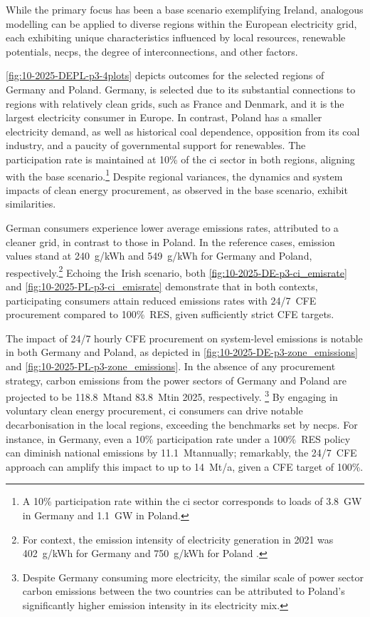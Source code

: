 While the primary focus has been a base scenario exemplifying Ireland, analogous modelling can be applied to diverse regions within the European electricity grid, each exhibiting unique characteristics influenced by local resources, renewable potentials, \gls{necp}s, the degree of interconnections, and other factors. 

\cref{fig:10-2025-DEPL-p3-4plots} depicts outcomes for the selected regions of Germany and Poland. 
Germany, is selected due to its substantial connections to regions with relatively clean grids, such as France and Denmark, and it is the largest electricity consumer in Europe. In contrast, Poland has a smaller electricity demand, as well as historical coal dependence, opposition from its coal industry, and a paucity of governmental support for renewables. 
The participation rate is maintained at 10\% of the \gls{ci} sector in both regions, aligning with the base scenario.\footnote{A 10\% participation rate within the \gls{ci} sector corresponds to loads of 3.8~GW in Germany and 1.1~GW in Poland.}
Despite regional variances, the dynamics and system impacts of clean energy procurement, as observed in the base scenario, exhibit similarities.

German consumers experience lower average emissions rates, attributed to a cleaner grid, in contrast to those in Poland.
In the reference cases, emission values stand at 240~g\co/kWh and 549~g\co/kWh for Germany and Poland, respectively.\footnote{For context, the emission intensity of electricity generation in 2021 was 402~g\co/kWh for Germany and 750~g\co/kWh for Poland \cite{EEA-GNGEmissionsEU}.} 
Echoing the Irish scenario, both \cref{fig:10-2025-DE-p3-ci_emisrate} and \cref{fig:10-2025-PL-p3-ci_emisrate} demonstrate that in both contexts, participating consumers attain reduced emissions rates with 24/7~CFE procurement compared to 100\%~RES, given sufficiently strict CFE targets.

The impact of 24/7 hourly CFE procurement on system-level \co emissions is notable in both Germany and Poland, as depicted in \cref{fig:10-2025-DE-p3-zone_emissions} and \cref{fig:10-2025-PL-p3-zone_emissions}.
In the absence of any procurement strategy, carbon emissions from the power sectors of Germany and Poland are projected to be 118.8~Mt\co and 83.8~Mt\co in 2025, respectively.%
\footnote{Despite Germany consuming more electricity, the similar scale of power sector carbon emissions between the two countries can be attributed to Poland's significantly higher emission intensity in its electricity mix.} 
By engaging in voluntary clean energy procurement, \gls{ci} consumers can drive notable decarbonisation in the local regions, exceeding the benchmarks set by \gls{necp}s.
For instance, in Germany, even a 10\% participation rate under a 100\%~RES policy can diminish national emissions by 11.1~Mt\co annually; remarkably, the 24/7~CFE approach can amplify this impact to up to 14~Mt\co/a, given a CFE target of 100\%. 

